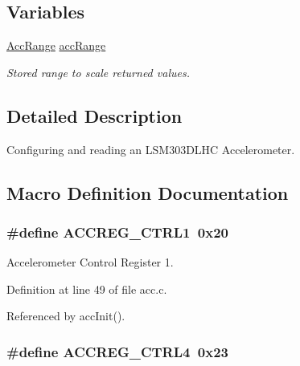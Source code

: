 \subsection*{Variables}
\begin{DoxyCompactItemize}
\item 
\hyperlink{group__acc_ga3d56e56c162b045de727006a11880324}{Acc\-Range} \hyperlink{group__acc_ga450bb9262f697cdcab7185674b9fc6a3}{acc\-Range}
\begin{DoxyCompactList}\small\item\em Stored range to scale returned values. \end{DoxyCompactList}\end{DoxyCompactItemize}


\subsection{Detailed Description}
Configuring and reading an L\-S\-M303\-D\-L\-H\-C Accelerometer. 

\subsection{Macro Definition Documentation}
\hypertarget{group__acc_gae81a43863d896c9afe65cc45bf8db9dc}{
\subsubsection[{A\-C\-C\-R\-E\-G\-\_\-\-C\-T\-R\-L1}]{\setlength{\rightskip}{0pt plus 5cm}\#define A\-C\-C\-R\-E\-G\-\_\-\-C\-T\-R\-L1~0x20}}\label{group__acc_gae81a43863d896c9afe65cc45bf8db9dc}


Accelerometer Control Register 1. 



Definition at line 49 of file acc.\-c.



Referenced by acc\-Init().

\hypertarget{group__acc_ga4369b46f297623a18b9d937623b7f783}{
\subsubsection[{A\-C\-C\-R\-E\-G\-\_\-\-C\-T\-R\-L4}]{\setlength{\rightskip}{0pt plus 5cm}\#define A\-C\-C\-R\-E\-G\-\_\-\-C\-T\-R\-L4~0x23}}\label{group__acc_ga4369b46f297623a18b9d937623b7f783}


